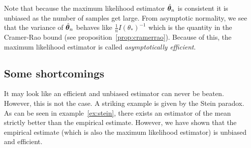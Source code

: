 Note that because the maximum likelihood estimator $\hat{\boldsymbol{\theta}}_n$ is consistent it is unbiased
as the number of samples get large. From asymptotic normality, we see that the
variance of $\hat{\boldsymbol{\theta}}_n$ behaves like $\frac1{n}I(\theta_*)^{-1}$ which is
the quantity in the Cramer-Rao bound (see proposition~\ref{prop:cramerrao}).
Because of this, the maximum likelihood estimator is called \emph{asymptotically
  efficient}.

\subsection{Some shortcomings}
It may look like an efficient and unbiased estimator can never be beaten.
However, this is not the case. A striking example is given by the Stein paradox.
As can be seen in example~\ref{ex:stein}, there exists an estimator of the mean
strictly better than the empirical estimate.
However, we have shown that the empirical estimate (which is also the maximum
likelihood estimator) is unbiased and efficient. 
